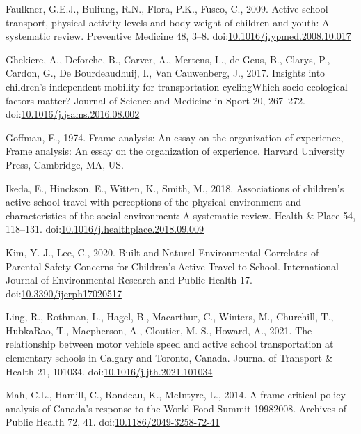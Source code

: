 \documentclass[]{elsarticle} %
\begin{document}
\leavevmode\hypertarget{ref-faulknerActiveSchoolTransport2009}{}%
Faulkner, G.E.J., Buliung, R.N., Flora, P.K., Fusco, C., 2009. Active
school transport, physical activity levels and body weight of children
and youth: A systematic review. Preventive Medicine 48, 3--8.
doi:\href{https://doi.org/10.1016/j.ypmed.2008.10.017}{10.1016/j.ypmed.2008.10.017}

\leavevmode\hypertarget{ref-ghekiereInsightsChildrenIndependent2017}{}%
Ghekiere, A., Deforche, B., Carver, A., Mertens, L., de Geus, B.,
Clarys, P., Cardon, G., De Bourdeaudhuij, I., Van Cauwenberg, J., 2017.
Insights into children's independent mobility for transportation
cyclingWhich socio-ecological factors matter? Journal of Science and
Medicine in Sport 20, 267--272.
doi:\href{https://doi.org/10.1016/j.jsams.2016.08.002}{10.1016/j.jsams.2016.08.002}

\leavevmode\hypertarget{ref-goffmanFrameAnalysisEssay1974}{}%
Goffman, E., 1974. Frame analysis: An essay on the organization of
experience, Frame analysis: An essay on the organization of experience.
Harvard University Press, Cambridge, MA, US.

\leavevmode\hypertarget{ref-ikedaAssociationsChildrenActive2018}{}%
Ikeda, E., Hinckson, E., Witten, K., Smith, M., 2018. Associations of
children's active school travel with perceptions of the physical
environment and characteristics of the social environment: A systematic
review. Health \& Place 54, 118--131.
doi:\href{https://doi.org/10.1016/j.healthplace.2018.09.009}{10.1016/j.healthplace.2018.09.009}

\leavevmode\hypertarget{ref-kimBuiltNaturalEnvironmental2020}{}%
Kim, Y.-J., Lee, C., 2020. Built and Natural Environmental Correlates of
Parental Safety Concerns for Children's Active Travel to School.
International Journal of Environmental Research and Public Health 17.
doi:\href{https://doi.org/10.3390/ijerph17020517}{10.3390/ijerph17020517}

\leavevmode\hypertarget{ref-lingRelationshipMotorVehicle2021}{}%
Ling, R., Rothman, L., Hagel, B., Macarthur, C., Winters, M., Churchill,
T., HubkaRao, T., Macpherson, A., Cloutier, M.-S., Howard, A., 2021. The
relationship between motor vehicle speed and active school
transportation at elementary schools in Calgary and Toronto, Canada.
Journal of Transport \& Health 21, 101034.
doi:\href{https://doi.org/10.1016/j.jth.2021.101034}{10.1016/j.jth.2021.101034}

\leavevmode\hypertarget{ref-mahFramecriticalPolicyAnalysis2014}{}%
Mah, C.L., Hamill, C., Rondeau, K., McIntyre, L., 2014. A frame-critical
policy analysis of Canada's response to the World Food Summit 19982008.
Archives of Public Health 72, 41.
doi:\href{https://doi.org/10.1186/2049-3258-72-41}{10.1186/2049-3258-72-41}
\end{document}
